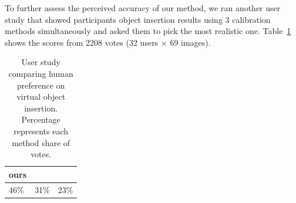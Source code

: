 To further assess the perceived accuracy of our method, we ran another user study that showed participants object insertion results using 3 calibration methods simultaneously and asked them to pick the most realistic one. Table~\ref{tab:user_comparison} shows the scores from 2208 votes (32 users $\times$ 69 images).

\begin{table}[!h]
\centering
\vspace{-0.5em}
\begin{tabular}{lll}
\toprule
ours & \cite{Workman2016} & \cite{Lee2014} \\
\midrule
46\% & 31\% & 23\% \\
\bottomrule
\end{tabular}
\vspace{0.5em}
\caption[Human method preference study results]{User study comparing human preference on virtual object insertion. Percentage represents each method share of votes.}
\label{tab:user_comparison}
\end{table}
